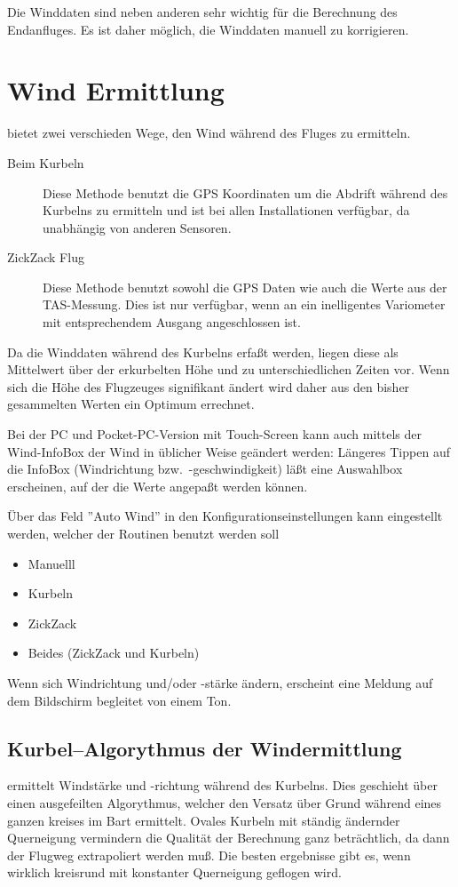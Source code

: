 Die Winddaten sind neben anderen sehr wichtig für die Berechnung des Endanfluges.
Es ist daher möglich, die Winddaten manuell zu korrigieren.

\section{Wind Ermittlung}\label{sec:wind-estimation}
\xc bietet zwei verschieden Wege, den Wind während des Fluges zu ermitteln.
\begin{description}
\item[Beim Kurbeln]  Diese Methode benutzt die  GPS Koordinaten um die Abdrift während
des Kurbelns zu ermitteln und ist bei allen \xc Installationen verfügbar, da unabhängig von anderen Sensoren.
\item[ZickZack Flug] Diese Methode benutzt sowohl die GPS Daten wie auch die Werte aus der TAS-Messung.
Dies ist nur verfügbar, wenn \xc an ein inelligentes Variometer mit entsprechendem Ausgang angeschlossen ist.
\end{description}

Da die Winddaten während des Kurbelns erfaßt werden, liegen diese als Mittelwert über der erkurbelten Höhe und
zu unterschiedlichen Zeiten vor. Wenn sich die Höhe des Flugzeuges signifikant ändert wird daher aus den
bisher gesammelten Werten ein Optimum errechnet.

Bei der PC und Pocket-PC-Version mit Touch-Screen kann auch mittels der Wind-InfoBox der Wind in
üblicher Weise geändert werden:
Längeres Tippen auf die InfoBox (Windrichtung bzw.\ -geschwindigkeit) läßt eine Auswahlbox
erscheinen, auf der die Werte angepaßt  werden können.

Über das Feld ''Auto Wind'' in den Konfigurationseinstellungen  kann
eingestellt werden, welcher der Routinen benutzt werden soll

\begin{itemize}
\item Manuelll
\item Kurbeln
\item ZickZack
\item Beides (ZickZack und Kurbeln)
\end{itemize}

Wenn sich Windrichtung und/oder -stärke ändern, erscheint eine Meldung  auf dem Bildschirm begleitet von einem Ton.
\subsection*{Kurbel--Algorythmus der Windermittlung}
\xc ermittelt Windstärke und -richtung während des Kurbelns. Dies geschieht über einen ausgefeilten Algorythmus, welcher den Versatz über Grund während eines ganzen kreises im Bart ermittelt. Ovales Kurbeln mit ständig ändernder Querneigung vermindern die Qualität der Berechnung ganz beträchtlich, da dann der Flugweg extrapoliert werden muß. Die besten ergebnisse gibt es, wenn wirklich kreisrund mit konstanter Querneigung geflogen wird.

